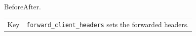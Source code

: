 \documentclass{article}
\begin{document}
\noindent Before\allowbreak After.

\begin{tabularx}{\linewidth}{lX}
Key & \texttt{forward\_client\_\allowbreak headers} sets the forwarded headers.\\
\end{tabularx}
\end{document}
